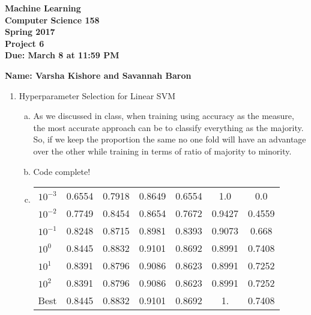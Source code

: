 \documentclass[11pt]{article}
\begin{document}
\newcommand{\Name}[1]{\noindent \textbf{Name:} #1 \\}
\newcommand{\pderiv}[2]{\frac{\partial #1}{\partial #2}}
\newcommand{\psderiv}[3]{\frac{\partial^2 #1}{\partial #2 \partial #3}}

\begin{center}
	\bf
	Machine Learning \\
	Computer Science 158 \\
	Spring 2017 \\
	\rm
	Project 6\\
	Due: March 8 at 11:59 PM \\
\end{center}
\noindent \textbf{Name: Varsha Kishore and Savannah Baron} \\
\begin{enumerate}[(2)]
\item Hyperparameter Selection for Linear SVM
\begin{enumerate}[(b)]
\item As we discussed in class, when training using accuracy as the measure, 
the most accurate approach can be to classify everything as the majority. So, if we 
keep the proportion the same no one fold will have an advantage over the other while
training in terms of ratio of majority to minority. 
\item Code complete!
\item 
\begin{tabular}{| l | c | c | c | c | c | c |}
  \hline			
  $10^{-3}$ & 0.6554 & 0.7918 & 0.8649 & 0.6554 & 1.0 & 0.0 \\
  $10^{-2}$ & 0.7749 & 0.8454 & 0.8654 & 0.7672 & 0.9427 & 0.4559  \\
  $10^{-1}$ &  0.8248 & 0.8715 & 0.8981 & 0.8393 & 0.9073 & 0.668 \\
  $10^{0}$ &  0.8445 & 0.8832 & 0.9101 & 0.8692 & 0.8991 & 0.7408 \\
  $10^{1}$ &  0.8391 & 0.8796 & 0.9086 & 0.8623 & 0.8991 & 0.7252 \\
  $10^{2}$ &  0.8391 & 0.8796 & 0.9086 & 0.8623 & 0.8991 & 0.7252 \\
  Best & 0.8445 & 0.8832 & 0.9101 & 0.8692 & 1. & 0.7408 \\
  \hline  
\end{tabular}


\end{enumerate}
\end{enumerate}
\end{document}
